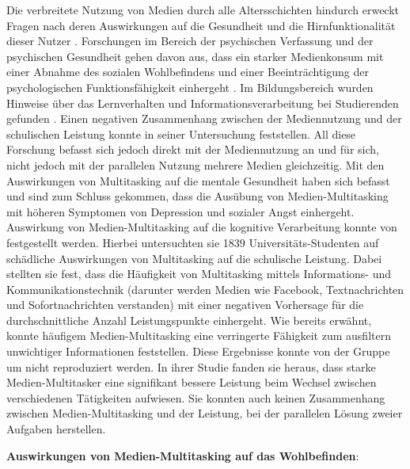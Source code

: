 Die verbreitete Nutzung von Medien durch alle Altersschichten hindurch erweckt Fragen nach deren Auswirkungen auf die Gesundheit und die Hirnfunktionalität dieser Nutzer . Forschungen im Bereich der psychischen Verfassung und der psychischen Gesundheit gehen davon aus, dass ein starker Medienkonsum mit einer Abnahme des sozialen Wohlbefindens und einer Beeinträchtigung der psychologischen Funktionsfähigkeit einhergeht \cite{Kraut1998, Moody2001}. Im Bildungsbereich wurden Hinweise über das Lernverhalten und Informationsverarbeitung bei Studierenden gefunden \cite{Prensky2001}. Einen negativen Zusammenhang zwischen der Mediennutzung und der schulischen Leistung konnte  in seiner Untersuchung feststellen. All diese Forschung befasst sich jedoch direkt mit der Mediennutzung an und für sich, nicht jedoch mit der parallelen Nutzung mehrere Medien gleichzeitig. Mit den Auswirkungen von Multitasking auf die mentale Gesundheit haben sich  befasst und sind zum Schluss gekommen, dass die Ausübung von Medien-Multitasking mit höheren Symptomen von Depression und sozialer Angst einhergeht. Auswirkung von Medien-Multitasking auf die kognitive Verarbeitung konnte von  festgestellt werden. Hierbei untersuchten sie 1839 Universitäts-Studenten auf schädliche Auswirkungen von Multitasking auf die schulische Leistung. Dabei stellten sie fest, dass die Häufigkeit von Multitasking mittels Informations- und Kommunikationstechnik (darunter werden Medien wie Facebook, Textnachrichten und Sofortnachrichten verstanden) mit einer negativen Vorhersage für die durchschnittliche Anzahl Leistungspunkte einhergeht. Wie bereits erwähnt, konnte  häufigem Medien-Multitasking eine verringerte Fähigkeit zum ausfiltern unwichtiger Informationen feststellen. Diese Ergebnisse konnte von der Gruppe um  nicht reproduziert werden. In ihrer Studie fanden sie heraus, dass starke Medien-Multitasker eine signifikant bessere Leistung beim Wechsel zwischen verschiedenen Tätigkeiten aufwiesen. Sie konnten auch keinen Zusammenhang zwischen Medien-Multitasking und der Leistung, bei der parallelen Lösung zweier Aufgaben herstellen. 
\par
\textbf{Auswirkungen von Medien-Multitasking auf das Wohlbefinden}: 
